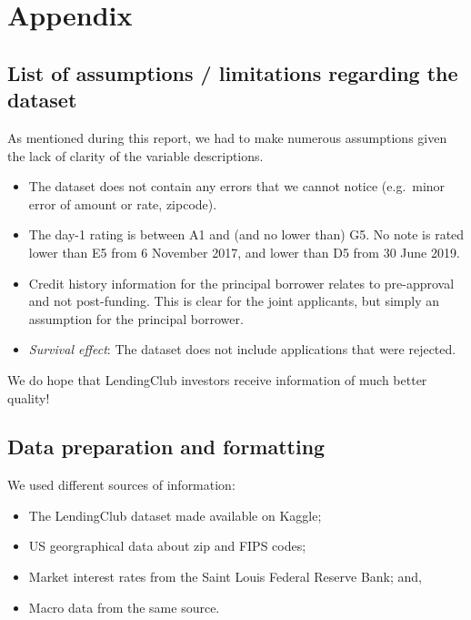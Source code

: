 \documentclass[11pt,]{report}
\begin{document}
\normalsize

\hypertarget{appendix}{%
\chapter*{Appendix}\label{appendix}}

\hypertarget{list-of-assumptions-limitations-regarding-the-dataset}{%
\section{List of assumptions / limitations regarding the dataset}\label{list-of-assumptions-limitations-regarding-the-dataset}}

As mentioned during this report, we had to make numerous assumptions given the lack of clarity of the variable descriptions.

\begin{itemize}
\item
  The dataset does not contain any errors that we cannot notice (e.g.~minor error of amount or rate, zipcode).
\item
  The day-1 rating is between A1 and (and no lower than) G5. No note is rated lower than E5 from 6 November 2017, and lower than D5 from 30 June 2019.
\item
  Credit history information for the principal borrower relates to pre-approval and not post-funding. This is clear for the joint applicants, but simply an assumption for the principal borrower.
\item
  \emph{Survival effect}: The dataset does not include applications that were rejected.
\end{itemize}

We do hope that LendingClub investors receive information of much better quality!

\hypertarget{data-preparation-and-formatting}{%
\section{Data preparation and formatting}\label{data-preparation-and-formatting}}

We used different sources of information:

\begin{itemize}
\item
  The LendingClub dataset made available on Kaggle;
\item
  US georgraphical data about zip and FIPS codes;
\item
  Market interest rates from the Saint Louis Federal Reserve Bank; and,
\item
  Macro data from the same source.
\end{itemize}
\end{document}
